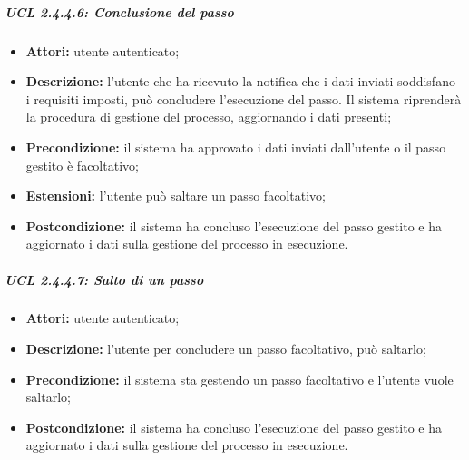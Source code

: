 \subparagraph{UCL 2.4.4.6: Conclusione del passo}
\begin{itemize}
\item \textbf{Attori:} utente autenticato;
\item \textbf{Descrizione:} l'utente che ha ricevuto la notifica che i dati inviati soddisfano i requisiti imposti, può concludere l'esecuzione del passo. Il sistema riprenderà la procedura di gestione del processo, aggiornando i dati presenti;
\item \textbf{Precondizione:} il sistema ha approvato i dati inviati dall'utente o il passo gestito è facoltativo;
\item \textbf{Estensioni:} l'utente può saltare un passo facoltativo;
\item \textbf{Postcondizione:} il sistema ha concluso l'esecuzione del passo gestito e ha aggiornato i dati sulla gestione del processo in esecuzione.
\end{itemize}

\subparagraph{UCL 2.4.4.7: Salto di un passo}
\begin{itemize}
\item \textbf{Attori:} utente autenticato;
\item \textbf{Descrizione:} l'utente per concludere un passo facoltativo, può saltarlo;
\item \textbf{Precondizione:} il sistema sta gestendo un passo facoltativo e l'utente vuole saltarlo;
\item \textbf{Postcondizione:} il sistema ha concluso l'esecuzione del passo gestito e ha aggiornato i dati sulla gestione del processo in esecuzione.
\end{itemize}

